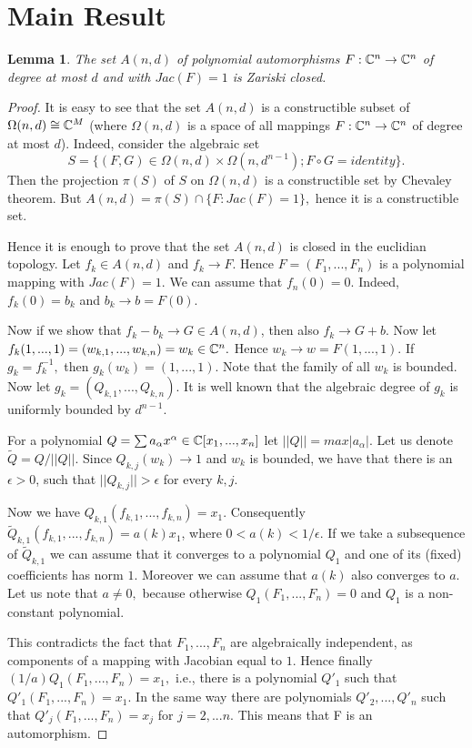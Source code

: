 \documentclass{amsart}
\newtheorem{lemma}[theorem]{Lemma}
\begin{document}
\section{Main Result}

\begin{lemma}
The set $A(n, d)$ of polynomial automorphisms $F : \Bbb C^n \to \Bbb C^n$ of degree at most  $d$ and with $Jac(F ) = 1$ is Zariski closed.
\end{lemma}

\begin{proof}
It is easy to see that the set $A(n, d)$ is a constructible subset of $\Omega(n,d)\cong\Bbb C^M$ (where  $\Omega(n,d)$ is a space of all  mappings $F:\Bbb C^n \to \Bbb C^n$ of degree at most $d$).  Indeed, consider the algebraic set 
$$S=\{ (F,G)\in \Omega(n,d)\times \Omega(n, d^{n-1}) ; F\circ G=identity\}.$$ Then the projection $\pi(S)$ of
$S$ on  $\Omega(n,d)$ is a constructible set by Chevaley theorem. But $A(n,d)=\pi(S) \cap \{ F : Jac(F)=1\},$ hence it is a constructible set.



Hence it is enough to prove that the set $A(n, d)$ is closed in the euclidian topology. Let $f_k \in A(n, d)$ and $f_k \to F.$ 
Hence $F = (F_1, ..., F_n)$ is a polynomial mapping with $Jac(F ) = 1.$ We can assume that $f_n (0) = 0.$ Indeed, $f_k (0) = b_k$ and $b_k \to b = F (0).$

 Now if we show that $f_k - b_k \to G \in A(n, d)$,  then also $f_k \to G + b.$ Now let $f_k(1, ..., 1) = (w_{k,1} , ..., w_{k,n}) = w_k \in \Bbb C^n.$
  Hence $w_k \to w = F (1, ..., 1).$  If $g_k = f^{ -1}_k,$ then $g_k(w_k) = (1, ..., 1).$  Note that the family of all $w_k$ is bounded.
  Now let $g_k = (Q_{k,1} , ..., Q_{k,n}).$ It is well known that the algebraic degree of $g_k$ is uniformly bounded by $d^{n-1}.$
  
   For a polynomial $Q = \sum a_\alpha x^\alpha\in  \Bbb C[x_1, ..., x_n]$ let $||Q|| =max |a_\alpha|.$ Let us denote $\tilde{Q} = Q/||Q||.$
    Since $Q_{k,j} (w_k) \to 1$ and $w_k$ is bounded, we have that there is an $\epsilon > 0$, such that $||Q_{k,j} || > \epsilon$ for every $k, j.$
    
    Now we have $Q_{k,1} (f_{k,1} , ..., f_{k,n} ) = x_1$. Consequently $\tilde{Q}_{k,1} (f_{k,1} , ..., f_{k,n} ) = a(k) x_1$, where $0 <a(k) < 1/\epsilon$. 
    If we take a subsequence of $\tilde{Q}_{k,1}$ we can assume that it converges to a polynomial $Q_1$ and one of its (fixed) coefficients has norm $1$. 
    Moreover we can assume that $a(k)$ also converges to $a$. Let us note that $a  \not= 0,$ because otherwise $Q_1(F_1, ..., F_n) = 0$ and $Q_1$ is a non-constant polynomial. 
    
    This contradicts the fact that $F_1, ..., F_n$ are algebraically independent, as components of a mapping with Jacobian equal to $1.$
     Hence finally $(1/a)Q_1(F_1, ..., F_n) = x_1,$ i.e., there is a polynomial $Q'_1$ such that $Q'_1(F_1, ..., F_n) = x_1.$
      In the same way there are polynomials $Q'_2, ..., Q'_n$ such that $Q'_j (F_1, ..., F_n) = x_j$ for $j = 2, ...n.$ This means that F is an automorphism.
\end{proof}
\end{document}
